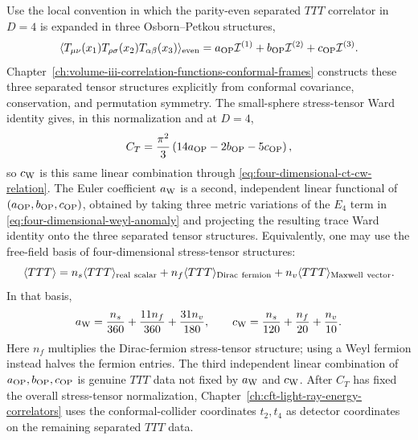 \begin{remark}
\label{rem:four-dimensional-anomaly-map-from-ttt}
Use the local convention in which the parity-even separated \(TTT\) correlator
in \(D=4\) is expanded in three Osborn--Petkou structures,
\[
  \langle T_{\mu\nu}(x_1)T_{\rho\sigma}(x_2)T_{\alpha\beta}(x_3)\rangle_{\rm even}
  =
  a_{\rm OP}\mathcal I^{(1)}
  +b_{\rm OP}\mathcal I^{(2)}
  +c_{\rm OP}\mathcal I^{(3)} .
\]
Chapter~\ref{ch:volume-iii-correlation-functions-conformal-frames} constructs
these three separated tensor structures explicitly from conformal covariance,
conservation, and permutation symmetry.  The small-sphere stress-tensor Ward
identity gives, in this normalization and at \(D=4\),
\begin{equation}
  C_T
  =
  \frac{\pi^2}{3}
  \left(
    14a_{\rm OP}-2b_{\rm OP}-5c_{\rm OP}
  \right),
  \label{eq:op-coefficients-ct-four-d}
\end{equation}
so \(c_{\rm W}\) is this same linear combination through
\eqref{eq:four-dimensional-ct-cw-relation}.  The Euler coefficient
\(a_{\rm W}\) is a second, independent linear functional of
\((a_{\rm OP},b_{\rm OP},c_{\rm OP})\), obtained by taking three metric
variations of the \(E_4\) term in
\eqref{eq:four-dimensional-weyl-anomaly} and projecting the resulting trace
Ward identity onto the three separated tensor structures.  Equivalently, one
may use the free-field basis of four-dimensional stress-tensor structures:
\begin{equation}
  \langle TTT\rangle
  =
  n_s\langle TTT\rangle_{\rm real\ scalar}
  +
  n_f\langle TTT\rangle_{\rm Dirac\ fermion}
  +
  n_v\langle TTT\rangle_{\rm Maxwell\ vector}.
  \label{eq:ttt-free-field-basis}
\end{equation}
In that basis,
\begin{equation}
  a_{\rm W}
  =
  \frac{n_s}{360}
  +
  \frac{11n_f}{360}
  +
  \frac{31n_v}{180},
  \qquad
  c_{\rm W}
  =
  \frac{n_s}{120}
  +
  \frac{n_f}{20}
  +
  \frac{n_v}{10}.
  \label{eq:four-dimensional-free-basis-anomaly-map}
\end{equation}
Here \(n_f\) multiplies the Dirac-fermion stress-tensor structure; using a
Weyl fermion instead halves the fermion entries.  The third independent
linear combination of \(a_{\rm OP},b_{\rm OP},c_{\rm OP}\) is genuine \(TTT\)
data not fixed by \(a_{\rm W}\) and \(c_{\rm W}\).  After \(C_T\) has fixed
the overall stress-tensor normalization, Chapter~\ref{ch:cft-light-ray-energy-correlators}
uses the conformal-collider coordinates \(t_2,t_4\) as detector coordinates on
the remaining separated \(TTT\) data.
\end{remark}

